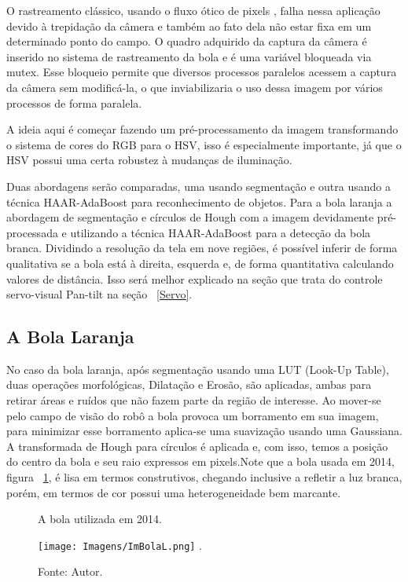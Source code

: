 O rastreamento clássico, usando o fluxo ótico de pixels \cite{Faria}, falha nessa aplicação devido à trepidação da câmera e também ao fato dela não estar fixa em um determinado ponto do campo. O quadro adquirido da captura da câmera é inserido no sistema de rastreamento da bola e é uma variável bloqueada via mutex. Esse bloqueio permite que diversos processos paralelos acessem a captura da câmera sem modificá-la, o que inviabilizaria o uso dessa imagem por vários processos de forma paralela. 

A ideia aqui é começar fazendo um pré-processamento da imagem transformando o sistema de cores do RGB para o HSV, isso é especialmente importante, já que o HSV possui uma certa robustez à mudanças de iluminação. 

Duas abordagens serão comparadas, uma usando segmentação e outra usando a técnica HAAR-AdaBoost para reconhecimento de objetos.
Para a bola laranja a abordagem de segmentação e círculos de Hough com a imagem devidamente pré-processada e utilizando a técnica HAAR-AdaBoost para a detecção da bola branca. Dividindo a resolução da tela em nove regiões, é possível inferir de forma qualitativa se a bola está à direita, esquerda e, de forma quantitativa calculando valores de distância. Isso será melhor explicado na seção que trata do controle servo-visual Pan-tilt na seção ~\ref{Servo}.

\subsection{A Bola Laranja}

No caso da bola laranja, após segmentação usando uma LUT (Look-Up Table), duas operações morfológicas, Dilatação e Erosão, são aplicadas, ambas para retirar áreas e ruídos que não fazem parte da região de interesse. Ao mover-se pelo campo de visão do robô a bola provoca um borramento em sua imagem, para minimizar esse borramento aplica-se uma suavização usando uma Gaussiana. A transformada de Hough para círculos é aplicada e, com isso, temos a posição do centro da bola e seu raio expressos em pixels.Note que a bola usada em 2014, figura ~\ref{Fig:BolaLaranja}, é lisa em termos construtivos, chegando inclusive a refletir a luz branca, porém, em termos de cor possui uma heterogeneidade bem marcante.

\begin{figure}[!h!]
\centering \caption{A bola utilizada em 2014.}
\texttt{[image: Imagens/ImBolaL.png]}
\DeclareGraphicsExtensions.
\caption*{Fonte: Autor.}
\label{Fig:BolaLaranja}
\end{figure}



